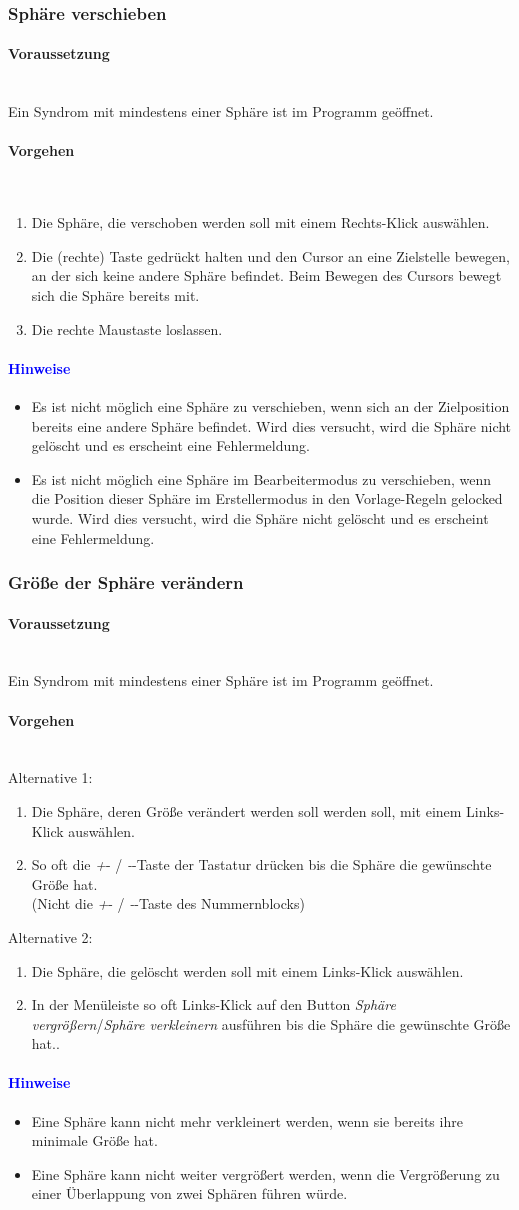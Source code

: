 \documentclass[enabledeprecatedfontcommands,fontsize=11pt,paper=a4,twoside]{scrartcl}
\newcommand*{\hint}{\paragraph{\textcolor{blue}{Hinweise}}}
\newcommand*{\condition}{\paragraph{Voraussetzung}$\;$ \vspace{0.2cm}\\}
\newcommand*{\actions}{\paragraph{Vorgehen} $\;$\vspace{0.2cm}\\}
\begin{document}
		\subsubsection{Sphäre verschieben}
				\condition 	
		Ein Syndrom mit mindestens einer Sphäre ist im Programm geöffnet. 
		\actions  
		\begin{enumerate}
			\item Die Sphäre, die verschoben werden soll mit einem Rechts-Klick auswählen.
			\item Die (rechte) Taste gedrückt halten und den Cursor an eine Zielstelle bewegen, an der sich keine andere Sphäre befindet. Beim Bewegen des Cursors bewegt sich die Sphäre bereits mit. 
			\item Die rechte Maustaste loslassen.
		\end{enumerate}
		\hint
		\begin{itemize}
			\item Es ist nicht möglich eine Sphäre zu verschieben, wenn sich an der Zielposition bereits eine andere Sphäre befindet. Wird dies versucht, wird die Sphäre nicht gelöscht und es erscheint eine Fehlermeldung.
			\item Es ist nicht möglich eine Sphäre im Bearbeitermodus zu verschieben, wenn die Position dieser Sphäre im Erstellermodus in den Vorlage-Regeln gelocked wurde. Wird dies versucht, wird die Sphäre nicht gelöscht und es erscheint eine Fehlermeldung.
		\end{itemize}
		\subsubsection{Größe der Sphäre verändern}
				\condition 	
		Ein Syndrom mit mindestens einer Sphäre ist im Programm geöffnet. 
		\actions  
		Alternative 1:
		\begin{enumerate}
			\item Die Sphäre, deren Größe verändert werden soll werden soll, mit einem Links-Klick auswählen.
			\item So oft die \glqq\textit{+}\grqq- / \glqq\textit{-}\grqq-Taste der Tastatur drücken bis die Sphäre die gewünschte Größe hat. \\(Nicht die \glqq\textit{+}\grqq- / \glqq\textit{-}\grqq-Taste des Nummernblocks)
		\end{enumerate}
		Alternative 2:
			\begin{enumerate}
			\item Die Sphäre, die gelöscht werden soll mit einem Links-Klick auswählen.
			\item In der Menüleiste so oft  Links-Klick auf den Button \textit{Sphäre vergrößern}/\textit{Sphäre verkleinern} ausführen bis die Sphäre die gewünschte Größe hat.. 
		\end{enumerate}
		\hint
		\begin{itemize}
			\item Eine Sphäre kann nicht mehr verkleinert werden, wenn sie bereits ihre minimale Größe hat.
			\item Eine Sphäre kann nicht weiter vergrößert werden, wenn die Vergrößerung zu einer Überlappung von zwei Sphären führen würde.
			\end{itemize}
\end{document}
